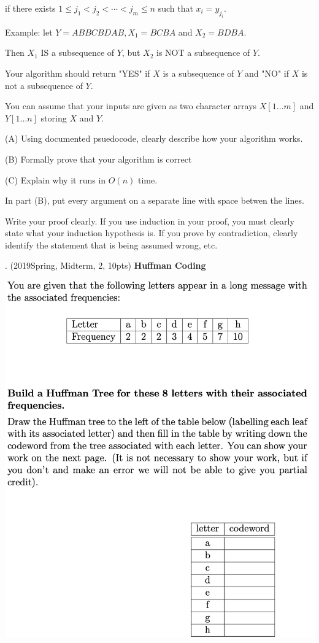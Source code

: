\begin{spacing}{1.3}
    \qquad if there exists $1 \leq j_{1}<j_{2}<\cdots<j_{m} \leq n$ such that $x_{i}=y_{j_{i}}$.
    
    Example: let $Y=A B B C B D A B, X_{1}=B C B A$ and $X_{2}=B D B A$.
    
    Then $X_{1}$ IS a subsequence of $Y$, but $X_{2}$ is NOT a subsequence of $Y$.
    
    Your algorithm should return "YES" if $X$ is a subsequence of $Y$ and "NO" if $X$ is not a subsequence of $Y$.
    
    You can assume that your inputs are given as two character arrays $X[1 \ldots m]$ and $Y[1 \ldots n]$ storing $X$ and $Y$.
    
    (A) Using documented psuedocode, clearly describe how your algorithm works.
    
    (B) Formally prove that your algorithm is correct
    
    (C) Explain why it runs in $O(n)$ time.
    
    In part (B), put every argument on a separate line with space betwen the lines.
    
    Write your proof clearly. If you use induction in your proof, you must clearly state what your induction hypothesis is. If you prove by contradiction, clearly identify the statement that is being assumed wrong, etc.


    . (2019Spring, Midterm, 2, 10pts) {\bf Huffman Coding}

    \includegraphics[scale=0.65]{images/07-exercise-2019s-huffman-question.png}


\end{spacing}
